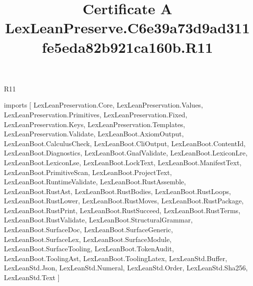 \begin{lexlean}{R11}
\title{Certificate A LexLeanPreserve.C6e39a73d9ad311fe5eda82b921ca160b.R11}
\begin{coremodule}
imports [
  LexLeanPreservation.Core,
  LexLeanPreservation.Values,
  LexLeanPreservation.Primitives,
  LexLeanPreservation.Fixed,
  LexLeanPreservation.Keys,
  LexLeanPreservation.Templates,
  LexLeanPreservation.Validate,
  LexLeanBoot.AxiomOutput,
  LexLeanBoot.CalculusCheck,
  LexLeanBoot.CliOutput,
  LexLeanBoot.ContentId,
  LexLeanBoot.Diagnostics,
  LexLeanBoot.GnafValidate,
  LexLeanBoot.LexiconLre,
  LexLeanBoot.LexiconLse,
  LexLeanBoot.LockText,
  LexLeanBoot.ManifestText,
  LexLeanBoot.PrimitiveScan,
  LexLeanBoot.ProjectText,
  LexLeanBoot.RuntimeValidate,
  LexLeanBoot.RustAssemble,
  LexLeanBoot.RustAst,
  LexLeanBoot.RustBodies,
  LexLeanBoot.RustLoops,
  LexLeanBoot.RustLower,
  LexLeanBoot.RustMoves,
  LexLeanBoot.RustPackage,
  LexLeanBoot.RustPrint,
  LexLeanBoot.RustSucceed,
  LexLeanBoot.RustTerms,
  LexLeanBoot.RustValidate,
  LexLeanBoot.StructuralGrammar,
  LexLeanBoot.SurfaceDoc,
  LexLeanBoot.SurfaceGeneric,
  LexLeanBoot.SurfaceLex,
  LexLeanBoot.SurfaceModule,
  LexLeanBoot.SurfaceTooling,
  LexLeanBoot.TokenAudit,
  LexLeanBoot.ToolingAst,
  LexLeanBoot.ToolingLatex,
  LexLeanStd.Buffer,
  LexLeanStd.Json,
  LexLeanStd.Numeral,
  LexLeanStd.Order,
  LexLeanStd.Sha256,
  LexLeanStd.Text
]


\end{coremodule}
\end{lexlean}
